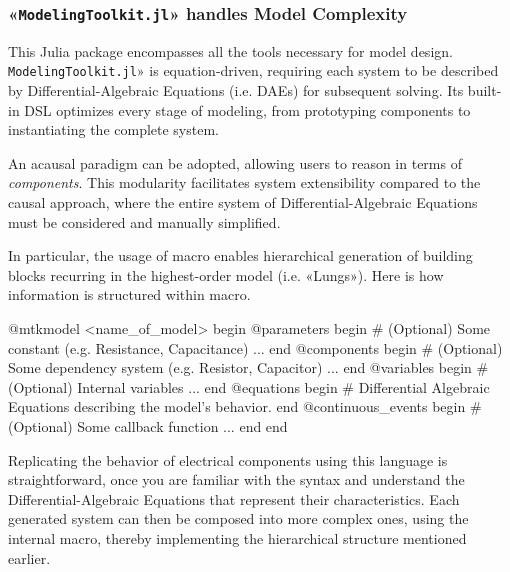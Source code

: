 \subsubsection{«\texttt{ModelingToolkit.jl}» handles
  Model Complexity}
\label{subsubsec:modelingtoolkit}

This Julia package encompasses all the tools necessary for model
design.  \texttt{ModelingToolkit.jl}» is equation-driven, requiring
each system to be described by Differential-Algebraic Equations
(i.e. DAEs) for subsequent solving\cite{ma2021}. Its built-in DSL
optimizes every stage of modeling, from prototyping components to
instantiating the complete system.

An acausal paradigm can be adopted, allowing users to reason in terms
of \emph{components}\cite{mtkdocs2024}. This modularity facilitates
system extensibility compared to the causal approach, where the entire
system of Differential-Algebraic Equations must be considered and
manually simplified\cite{ma2024}.

In particular, the usage of  macro enables
hierarchical generation of building blocks recurring in the
highest-order model (i.e. «Lungs»).  Here is how information is
structured within  macro.

\begin{jllisting}[label=@mtkmodel, caption={\jlinl{@mtkmodel}: a macro for systems prototyping.}]
  @mtkmodel <name_of_model> begin
      @parameters begin
          # (Optional) Some constant (e.g. Resistance, Capacitance) ...
      end
      @components begin
          # (Optional) Some dependency system (e.g. Resistor, Capacitor) ...
      end
      @variables begin
          # (Optional) Internal variables ...
      end
      @equations begin
          # Differential Algebraic Equations describing the model's behavior.
      end
      @continuous_events begin
          # (Optional) Some callback function ...
      end
  end
\end{jllisting}

Replicating the behavior of electrical components using this language
is straightforward, once you are familiar with the syntax and
understand the Differential-Algebraic Equations that represent their
characteristics.  Each generated system can then be composed into more
complex ones, using the internal  macro, thereby
implementing the hierarchical structure mentioned earlier.

